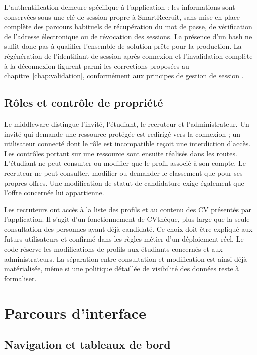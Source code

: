 L'authentification demeure spécifique à l'application : les informations sont conservées sous une clé de session propre à SmartRecruit, sans mise en place complète des parcours habituels de récupération du mot de passe, de vérification de l'adresse électronique ou de révocation des sessions. La présence d'un hash ne suffit donc pas à qualifier l'ensemble de solution prête pour la production. La régénération de l'identifiant de session après connexion et l'invalidation complète à la déconnexion figurent parmi les corrections proposées au chapitre~\ref{chap:validation}, conformément aux principes de gestion de session \cite{owasp-session}.

\subsection{Rôles et contrôle de propriété}

Le middleware distingue l'invité, l'étudiant, le recruteur et l'administrateur. Un invité qui demande une ressource protégée est redirigé vers la connexion ; un utilisateur connecté dont le rôle est incompatible reçoit une interdiction d'accès. Les contrôles portant sur une ressource sont ensuite réalisés dans les routes. L'étudiant ne peut consulter ou modifier que le profil associé à son compte. Le recruteur ne peut consulter, modifier ou demander le classement que pour ses propres offres. Une modification de statut de candidature exige également que l'offre concernée lui appartienne.

Les recruteurs ont accès à la liste des profils et au contenu des CV présentés par l'application. Il s'agit d'un fonctionnement de CVthèque, plus large que la seule consultation des personnes ayant déjà candidaté. Ce choix doit être expliqué aux futurs utilisateurs et confirmé dans les règles métier d'un déploiement réel. Le code réserve les modifications de profils aux étudiants concernés et aux administrateurs. La séparation entre consultation et modification est ainsi déjà matérialisée, même si une politique détaillée de visibilité des données reste à formaliser.

\section{Parcours d'interface}

\subsection{Navigation et tableaux de bord}

